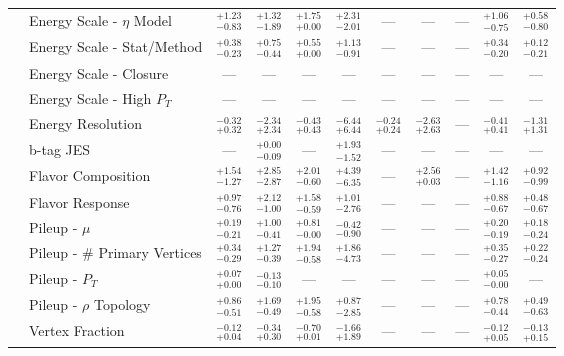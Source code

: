 \begin{tabular}{|cl||ccccccc|c||c|}
\cline{2-11}
&Energy Scale - $\eta$ Model &  $^{+1.23}_{-0.83}$  &  $^{+1.32}_{-1.89}$  &  $^{+1.75}_{+0.00}$  &  $^{+2.31}_{-2.01}$  & --- & --- & --- &  $^{+1.06}_{-0.75}$  &  $^{+0.58}_{-0.80}$ \\ 
\cline{2-11}
&Energy Scale - Stat/Method &  $^{+0.38}_{-0.23}$  &  $^{+0.75}_{-0.44}$  &  $^{+0.55}_{+0.00}$  &  $^{+1.13}_{-0.91}$  & --- & --- & --- &  $^{+0.34}_{-0.20}$  &  $^{+0.12}_{-0.21}$ \\ 
\cline{2-11}
&Energy Scale - Closure & --- & --- & --- & --- & --- & --- & --- & --- & ---\\ 
\cline{2-11}
&Energy Scale - High $P_{T}$ & --- & --- & --- & --- & --- & --- & --- & --- & ---\\ 
\cline{2-11}
&Energy Resolution &  $^{-0.32}_{+0.32}$  &  $^{-2.34}_{+2.34}$  &  $^{-0.43}_{+0.43}$  &  $^{-6.44}_{+6.44}$  &  $^{-0.24}_{+0.24}$  &  $^{-2.63}_{+2.63}$  & --- &  $^{-0.41}_{+0.41}$  &  $^{-1.31}_{+1.31}$ \\ 
\cline{2-11}
&b-tag JES & --- &  $^{+0.00}_{-0.09}$  & --- &  $^{+1.93}_{-1.52}$  & --- & --- & --- & --- & ---\\ 
\cline{2-11}
&Flavor Composition &  $^{+1.54}_{-1.27}$  &  $^{+2.85}_{-2.87}$  &  $^{+2.01}_{-0.60}$  &  $^{+4.39}_{-6.35}$  & --- &  $^{+2.56}_{+0.03}$  & --- &  $^{+1.42}_{-1.16}$  &  $^{+0.92}_{-0.99}$ \\ 
\cline{2-11}
&Flavor Response &  $^{+0.97}_{-0.76}$  &  $^{+2.12}_{-1.00}$  &  $^{+1.58}_{-0.59}$  &  $^{+1.01}_{-2.76}$  & --- & --- & --- &  $^{+0.88}_{-0.67}$  &  $^{+0.48}_{-0.67}$ \\ 
\cline{2-11}
&Pileup - $\mu$ &  $^{+0.19}_{-0.21}$  &  $^{+1.00}_{-0.41}$  &  $^{+0.81}_{-0.00}$  &  $^{-0.42}_{-0.90}$  & --- & --- & --- &  $^{+0.20}_{-0.19}$  &  $^{+0.18}_{-0.24}$ \\ 
\cline{2-11}
&Pileup - \# Primary Vertices &  $^{+0.34}_{-0.29}$  &  $^{+1.27}_{-0.39}$  &  $^{+1.94}_{-0.58}$  &  $^{+1.86}_{-4.73}$  & --- & --- & --- &  $^{+0.35}_{-0.27}$  &  $^{+0.22}_{-0.24}$ \\ 
\cline{2-11}
&Pileup -  $P_{T}$ &  $^{+0.07}_{+0.00}$  &  $^{-0.13}_{-0.10}$  & --- & --- & --- & --- & --- &  $^{+0.05}_{-0.00}$  & ---\\ 
\cline{2-11}
&Pileup - $\rho$ Topology &  $^{+0.86}_{-0.51}$  &  $^{+1.69}_{-0.49}$  &  $^{+1.95}_{-0.58}$  &  $^{+0.87}_{-2.85}$  & --- & --- & --- &  $^{+0.78}_{-0.44}$  &  $^{+0.49}_{-0.63}$ \\ 
\cline{2-11}
&Vertex Fraction &  $^{-0.12}_{+0.04}$  &  $^{-0.34}_{+0.30}$  &  $^{-0.70}_{+0.01}$  &  $^{-1.66}_{+1.89}$  & --- & --- & --- &  $^{-0.12}_{+0.05}$  &  $^{-0.13}_{+0.15}$ \\ 

\end{tabular}
